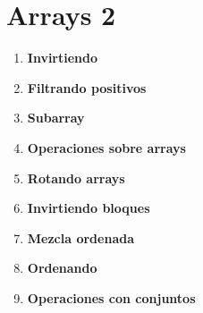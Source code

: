 \section{Arrays 2}
\begin{enumerate}
    \item \textbf{Invirtiendo}\\
    

    \item \textbf{Filtrando positivos}
    

    \item \textbf{Subarray}\\
    

    \item \textbf{Operaciones sobre arrays}
    

     \item \textbf{Rotando arrays}\\
    

    \item \textbf{Invirtiendo bloques}\\
    

    \item \textbf{Mezcla ordenada}\\
    

    \item \textbf{Ordenando}\\
    

    \item \textbf{Operaciones con conjuntos}\\
    
\end{enumerate}